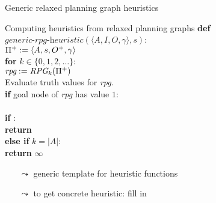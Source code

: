 \documentclass{gkibeamer}
\begin{document}
\begin{frame}{Generic relaxed planning graph heuristics}
  \begin{block}{Computing heuristics from relaxed planning graphs}
    \textbf{def}
    $\textit{generic-rpg-heuristic}(\langle A, I, O,
    \gamma\rangle, s)$: \\
    {}\qquad ${\Pi}^+ := \langle A, s, {O}^+,
    \gamma\rangle$ \\
    {}\qquad\textbf{for} $k \in \{0, 1, 2, \dots\}$: \\
    {}\qquad\qquad $\textit{rpg} := \textit{RPG}_k({\Pi}^+)$
    \\
    {}\qquad\qquad Evaluate truth values for \textit{rpg}. \\
    {}\qquad\qquad \textbf{if} goal node of \textit{rpg}
    has value $1$: \\
    {}\qquad\qquad\qquad {}
    \\
    \qquad\qquad\qquad \textbf{if} : \\
    \qquad\qquad\qquad\qquad \textbf{return}  \\
    \qquad\qquad \textbf{else if} $k = |A|$: \\
    {}\qquad\qquad\qquad \textbf{return} $\infty$
  \end{block}
  \begin{itemize}
  \item[$\leadsto$] \alert{generic template} for heuristic functions
  \item[$\leadsto$] to get \alert{concrete heuristic}: fill in
  \end{itemize}
\end{frame}
\end{document}
